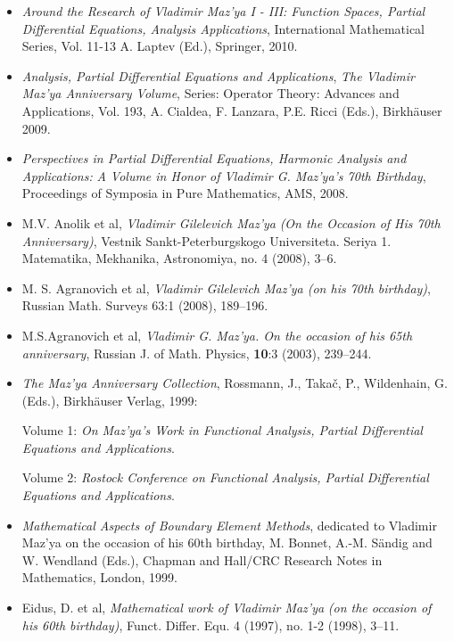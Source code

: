 \documentclass{article}
\begin{document}
\begin{itemize}
\item {\it Around the Research of Vladimir Maz'ya I - III: Function Spaces, Partial Differential Equations, Analysis Applications}, International Mathematical Series, Vol. 11-13 A. Laptev (Ed.), Springer, 2010.
\item  {\it Analysis, Partial Differential Equations and Applications},
       {{\it The Vladimir Maz'ya Anniversary Volume}},
   Series: Operator Theory: Advances and Applications, Vol. 193, A. Cialdea, F. Lanzara, P.E. Ricci (Eds.),  Birkh\"auser 2009.
 \item {\it Perspectives in Partial Differential Equations, Harmonic Analysis and Applications:}
      {{\it A Volume in Honor of Vladimir G. Maz'ya's 70th Birthday}},
          Proceedings of Symposia in Pure Mathematics, AMS, 2008.
\item
M.V. Anolik et al,
     {{\it Vladimir Gilelevich Maz'ya}}
{\it (On the Occasion of His 70th Anniversary)},
Vestnik Sankt-Peterburgskogo Universiteta. Seriya 1. Matematika, Mekhanika, Astronomiya,  no. 4 (2008),   3--6.
\item  M. S. Agranovich et al,  {\it Vladimir Gilelevich Maz'ya (on his 70th birthday)}, Russian Math. Surveys 63:1 (2008),  189--196.
\item M.S.Agranovich et al,
     {{\it Vladimir G. Maz'ya. On the occasion of his 65th anniversary}},
     Russian J. of Math. Physics,
{\bf 10}:3 (2003), 239--244.
         \item
                  {\it The Maz'ya Anniversary Collection},  Rossmann, J.,
  Taka{\v c}, P., Wildenhain, G. (Eds.),  Birkh{\"a}user
  Verlag, 1999:

           Volume 1: {\it On Maz'ya's Work
in Functional Analysis,
  Partial Differential Equations and Applications}.

             Volume 2: {\it Rostock Conference
on Functional Analysis,
  Partial Differential Equations and Applications}.
\item
            {\it Mathematical Aspects of Boundary Element Methods}, dedicated to
  Vladimir Maz'ya on the occasion of his 60th birthday,  M.
  Bonnet, A.-M. S{\"a}ndig and
W. Wendland (Eds.), Chapman and
  Hall/CRC Research Notes in Mathematics, London, 1999.
      \item Eidus, D. et al,
       {{\it Mathematical work of Vladimir Maz'ya}}
  {\it  (on the occasion of his 60th birthday)}, Funct. Differ. Equ. 4
  (1997), no. 1-2 (1998), 3--11.
\end{itemize}
\end{document}
